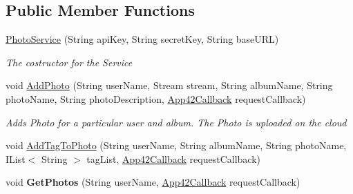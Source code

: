 \subsection*{Public Member Functions}
\begin{DoxyCompactItemize}
\item 
\hyperlink{classcom_1_1shephertz_1_1app42_1_1paas_1_1sdk_1_1windows_1_1gallery_1_1_photo_service_a501e84110ce35ffdf2a3158b3fdb6e0a}{Photo\+Service} (String api\+Key, String secret\+Key, String base\+U\+R\+L)
\begin{DoxyCompactList}\small\item\em The costructor for the Service \end{DoxyCompactList}\item 
void \hyperlink{classcom_1_1shephertz_1_1app42_1_1paas_1_1sdk_1_1windows_1_1gallery_1_1_photo_service_a6496f96aadf26b8b7041c3ef775c6717}{Add\+Photo} (String user\+Name, Stream stream, String album\+Name, String photo\+Name, String photo\+Description, \hyperlink{interfacecom_1_1shephertz_1_1app42_1_1paas_1_1sdk_1_1windows_1_1_app42_callback}{App42\+Callback} request\+Callback)
\begin{DoxyCompactList}\small\item\em Adds Photo for a particular user and album. The Photo is uploaded on the cloud \end{DoxyCompactList}\item 
void \hyperlink{classcom_1_1shephertz_1_1app42_1_1paas_1_1sdk_1_1windows_1_1gallery_1_1_photo_service_a0db59a8dabf7df7309bef8609bf30776}{Add\+Tag\+To\+Photo} (String user\+Name, String album\+Name, String photo\+Name, I\+List$<$ String $>$ tag\+List, \hyperlink{interfacecom_1_1shephertz_1_1app42_1_1paas_1_1sdk_1_1windows_1_1_app42_callback}{App42\+Callback} request\+Callback)
\item 
\hypertarget{classcom_1_1shephertz_1_1app42_1_1paas_1_1sdk_1_1windows_1_1gallery_1_1_photo_service_a09faaaab30f30167ab3ad88b67a5fa3e}{void {\bfseries Get\+Photos} (String user\+Name, \hyperlink{interfacecom_1_1shephertz_1_1app42_1_1paas_1_1sdk_1_1windows_1_1_app42_callback}{App42\+Callback} request\+Callback)}\label{classcom_1_1shephertz_1_1app42_1_1paas_1_1sdk_1_1windows_1_1gallery_1_1_photo_service_a09faaaab30f30167ab3ad88b67a5fa3e}


\end{DoxyCompactItemize}
